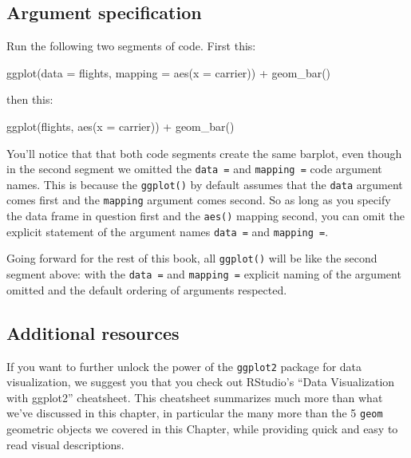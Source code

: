\documentclass[
  letterpaper,
  DIV=11,
  numbers=noendperiod]{scrreprt}
\newenvironment{Shaded}{\begin{snugshade}}{\end{snugshade}}
\newcommand{\AttributeTok}[1]{\textcolor[rgb]{0.40,0.45,0.13}{#1}}
\newcommand{\FunctionTok}[1]{\textcolor[rgb]{0.28,0.35,0.67}{#1}}
\newcommand{\NormalTok}[1]{\textcolor[rgb]{0.00,0.23,0.31}{#1}}
\newcommand{\SpecialCharTok}[1]{\textcolor[rgb]{0.37,0.37,0.37}{#1}}
\theoremstyle{definition}
\theoremstyle{remark}
\begin{document}
\hypertarget{argument-specification}{%
\subsection{Argument specification}\label{argument-specification}}

Run the following two segments of code. First this:

\begin{Shaded}
\begin{Highlighting}[]
\FunctionTok{ggplot}\NormalTok{(}\AttributeTok{data =}\NormalTok{ flights, }\AttributeTok{mapping =} \FunctionTok{aes}\NormalTok{(}\AttributeTok{x =}\NormalTok{ carrier)) }\SpecialCharTok{+}
  \FunctionTok{geom\_bar}\NormalTok{()}
\end{Highlighting}
\end{Shaded}

then this:

\begin{Shaded}
\begin{Highlighting}[]
\FunctionTok{ggplot}\NormalTok{(flights, }\FunctionTok{aes}\NormalTok{(}\AttributeTok{x =}\NormalTok{ carrier)) }\SpecialCharTok{+}
  \FunctionTok{geom\_bar}\NormalTok{()}
\end{Highlighting}
\end{Shaded}

You'll notice that that both code segments create the same barplot, even
though in the second segment we omitted the \texttt{data\ =} and
\texttt{mapping\ =} code argument names. This is because the
\texttt{ggplot()} by default assumes that the \texttt{data} argument
comes first and the \texttt{mapping} argument comes second. So as long
as you specify the data frame in question first and the \texttt{aes()}
mapping second, you can omit the explicit statement of the argument
names \texttt{data\ =} and \texttt{mapping\ =}.

Going forward for the rest of this book, all \texttt{ggplot()} will be
like the second segment above: with the \texttt{data\ =} and
\texttt{mapping\ =} explicit naming of the argument omitted and the
default ordering of arguments respected.

\hypertarget{additional-resources-1}{%
\subsection{Additional resources}\label{additional-resources-1}}

If you want to further unlock the power of the \texttt{ggplot2} package
for data visualization, we suggest you that you check out RStudio's
``Data Visualization with ggplot2'' cheatsheet. This cheatsheet
summarizes much more than what we've discussed in this chapter, in
particular the many more than the 5 \texttt{geom} geometric objects we
covered in this Chapter, while providing quick and easy to read visual
descriptions.
\end{document}

